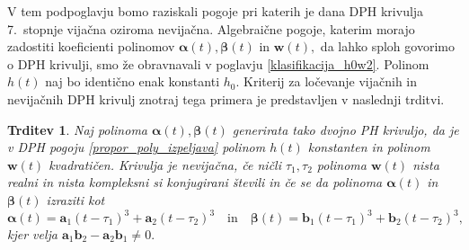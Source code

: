 \documentclass[12pt,a4paper,twoside]{article}
\theoremstyle{definition} %
\theoremstyle{plain} %
\newtheorem{trditev}[definicija]{Trditev}
\numberwithin{equation}{section}  %
\newcommand{\aV}{\mathbf{a}}
\newcommand{\bV}{\mathbf{b}}
\newcommand{\wV}{\mathbf{w}}
\newcommand{\balpha}{\boldsymbol \alpha}
\newcommand{\bbeta}{\boldsymbol \beta}
\begin{document}
V tem podpoglavju bomo raziskali pogoje pri katerih je dana DPH krivulja 7.\ stopnje vijačna oziroma nevijačna. Algebraične pogoje, katerim morajo zadostiti koeficienti polinomov $\balpha(t),\bbeta(t)$ in $\wV(t),$ da lahko sploh govorimo o DPH krivulji, smo že obravnavali v poglavju \ref{klasifikacija_h0w2}. Polinom $h(t)$ naj bo identično enak konstanti $h_0.$ Kriterij za ločevanje vijačnih in nevijačnih DPH krivulj znotraj tega primera je predstavljen v naslednji trditvi.
\begin{trditev}
	\label{locevanje_trditev_h0w2}
	Naj polinoma $\balpha(t),\bbeta(t)$ generirata tako dvojno PH krivuljo, da je v DPH pogoju \eqref{propor_poly_izpeljava} polinom $h(t)$ konstanten in polinom $\wV(t)$ kvadratičen. Krivulja je nevijačna, če ničli $\tau_1,\tau_2$ polinoma $\wV(t)$ nista realni in nista kompleksni si konjugirani števili in če se da polinoma $\balpha(t)$ in $\bbeta(t)$ izraziti kot
	\begin{equation}
		\label{polinoma_h0w2}
		\balpha(t)=\aV_1(t-\tau_1)^3+\aV_2(t-\tau_2)^3\quad\text{in}\quad\bbeta(t)=\bV_1(t-\tau_1)^3+\bV_2(t-\tau_2)^3,
	\end{equation}
	kjer velja $\aV_1\bV_2-\aV_2\bV_1\neq0.$
\end{trditev}
\end{document}
